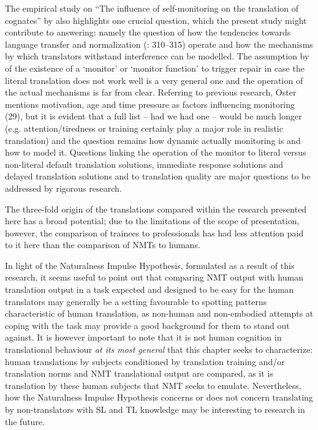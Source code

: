 \documentclass[output=paper]{langscibook}
\begin{document}
The empirical study on “The influence of self-monitoring on the translation of cognates” by \citet{Oster2017} also highlights one crucial question, which the present study might contribute to answering: namely the question of how the tendencies towards language transfer and normalization (\citealt{Toury1995}: 310–315) operate and how the mechanisms by which translators withstand interference can be modelled. The assumption by \citet{Tirkkonen-Condit2005} of the existence of a ‘monitor’ or ‘monitor function’ to trigger repair in case the literal translation does not work well is a very general one and the operation of the actual mechanisms is far from clear. Referring to previous research, Oster mentions motivation, age and time pressure as factors influencing monitoring (29), but it is evident that a full list – had we had one – would be much longer (e.g. attention/tiredness or training certainly play a major role in realistic translation) and the question remains how dynamic actually monitoring is and how to model it. Questions linking the operation of the monitor to literal versus non-literal default translation solutions, immediate response solutions and delayed translation solutions and to translation quality are major questions to be addressed by rigorous research.

The three{}-fold origin of the translations compared within the research presented here has a broad potential; due to the limitations of the scope of presentation, however, the comparison of trainees to professionals has had less attention paid to it here than the comparison of NMTs to humans.

In light of the Naturalness Impulse Hypothesis, formulated as a result of this research, it seems useful to point out that comparing NMT output with human translation output in a task expected and designed to be easy for the human translators may generally be a setting favourable to spotting patterns characteristic of human translation, as non-human and non-embodied attempts at coping with the task may provide a good background for them to stand out against. It is however important to note that it is not human cognition in translational behaviour \textit{at its most general} that this chapter seeks to characterize: human translations by subjects conditioned by translation training and/or translation norms and NMT translational output are compared, as it is translation by these human subjects that NMT seeks to emulate. Nevertheless, how the Naturalness Impulse Hypothesis concerns or does not concern translating by non-translators with SL and TL knowledge may be interesting to research in the future.
\end{document}
